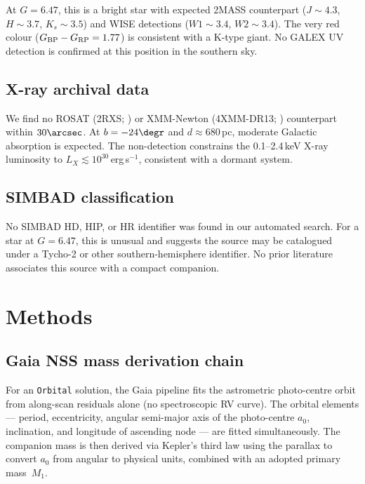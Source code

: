 \documentclass[usenatbib,fleqn]{mnras}
\begin{document}
At $G = 6.47$, this is a bright star with expected 2MASS
counterpart ($J \sim 4.3$, $H \sim 3.7$, $K_s \sim 3.5$) and
WISE detections ($W1 \sim 3.4$, $W2 \sim 3.4$).  The very red
colour ($G_{\rm BP} - G_{\rm RP} = 1.77$) is consistent with a
K-type giant.  No GALEX UV detection is confirmed at this position
in the southern sky.

\subsection{X-ray archival data}
\label{sec:data:xray}

We find no ROSAT (2RXS; \citealt{Boller2016}) or XMM-Newton
(4XMM-DR13; \citealt{Webb2020}) counterpart within $30\arcsec$.
At $b = -24\degr$ and $d \approx 680$\,pc, moderate Galactic
absorption is expected.  The non-detection constrains the
0.1--2.4\,keV X-ray luminosity to
$L_X \lesssim 10^{30}$\,erg\,s$^{-1}$, consistent with a dormant
system.

\subsection{SIMBAD classification}
\label{sec:data:simbad}

No SIMBAD \citep{Wenger2000} HD, HIP, or HR identifier was found
in our automated search.  For a star at $G = 6.47$, this is
unusual and suggests the source may be catalogued under a Tycho-2
or other southern-hemisphere identifier.  No prior literature
associates this source with a compact companion.

\section{Methods}
\label{sec:methods}

\subsection{Gaia NSS mass derivation chain}
\label{sec:methods:nss}

For an \texttt{Orbital} solution, the Gaia pipeline fits the
astrometric photo-centre orbit from along-scan residuals alone
(no spectroscopic RV curve).  The orbital elements --- period,
eccentricity, angular semi-major axis of the photo-centre $a_0$,
inclination, and longitude of ascending node --- are fitted
simultaneously.  The companion mass is then derived via Kepler's
third law using the parallax to convert $a_0$ from angular to
physical units, combined with an adopted primary mass~$M_1$.
\end{document}
